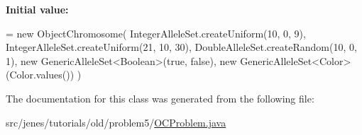 {\bfseries Initial value\-:}
\begin{DoxyCode}
=
            \textcolor{keyword}{new} ObjectChromosome( IntegerAlleleSet.createUniform(10, 0, 9),
            IntegerAlleleSet.createUniform(21, 10, 30),
            DoubleAlleleSet.createRandom(10, 0, 1),
            \textcolor{keyword}{new} GenericAlleleSet<Boolean>(\textcolor{keyword}{true}, \textcolor{keyword}{false}),
            \textcolor{keyword}{new} GenericAlleleSet<Color>(Color.values()) )
\end{DoxyCode}


The documentation for this class was generated from the following file\-:\begin{DoxyCompactItemize}
\item 
src/jenes/tutorials/old/problem5/\hyperlink{old_2problem5_2_o_c_problem_8java}{O\-C\-Problem.\-java}\end{DoxyCompactItemize}
